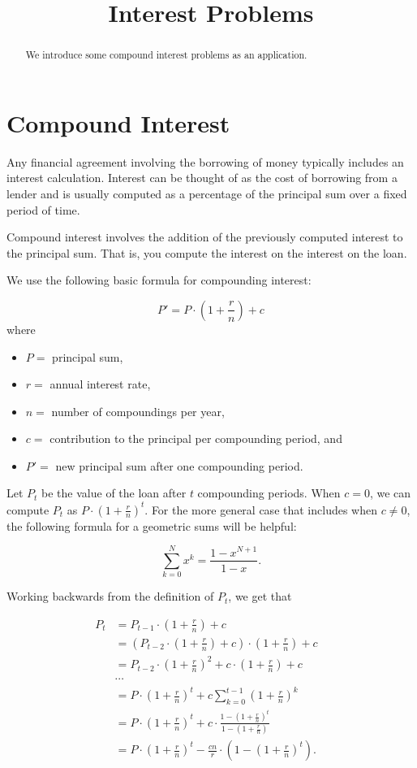 \documentclass{ximera}
\title{Interest Problems}
\begin{document}
\begin{abstract}  
We introduce some compound interest problems as an application.
\end{abstract}  
\maketitle

\section{Compound Interest}

Any financial agreement involving the borrowing of money typically includes an interest calculation. Interest can be thought of as the cost of borrowing from a lender and is usually computed as a percentage of the principal sum over a fixed period of time.

Compound interest involves the addition of the previously computed interest to the principal sum. That is, you compute the interest on the interest on the loan.

We use the following basic formula for compounding interest:

$$P' = P\cdot\left(1+\frac{r}{n}\right) + c $$ where
\begin{itemize}
	\item $P = $ principal sum,
	\item $r = $ annual interest rate,
	\item $n = $ number of compoundings per year,
	\item $c = $ contribution to the principal per compounding period, and 
	\item $P' = $ new principal sum after one compounding period.
\end{itemize}

Let $P_t$ be the value of the loan after $t$ compounding periods. When $c=0$, we can compute $P_t$ as $P\cdot\left(1+\frac{r}{n}\right)^{t}$. For the more general case that includes when $c\neq 0$, the following formula for a geometric sums will be helpful:

$$\sum_{k=0}^Nx^k = \frac{1-x^{N+1}}{1-x}.$$

Working backwards from the definition of $P_t$, we get that

\begin{align*}
	P_t & = P_{t-1}\cdot\left(1+\frac{r}{n}\right) + c\\
	    & = \left(P_{t-2}\cdot\left(1+\frac{r}{n}\right) + c\right)\cdot\left(1+\frac{r}{n}\right) + c\\
	    & = P_{t-2}\cdot\left(1+\frac{r}{n}\right)^2 + c\cdot\left(1+\frac{r}{n}\right) + c\\
	    & \cdots & \\
	    & = P\cdot\left(1+\frac{r}{n}\right)^t + c\sum_{k=0}^{t-1}\left(1+\frac{r}{n}\right)^k\\
	    & = P\cdot\left(1+\frac{r}{n}\right)^t + c\cdot\frac{1-\left(1+\frac{r}{n}\right)^t}{1-\left(1+\frac{r}{n}\right)}\\
	    & = P\cdot\left(1+\frac{r}{n}\right)^t - \frac{cn}{r}\cdot\left(1-\left(1+\frac{r}{n}\right)^t\right).
\end{align*}
\end{document}
